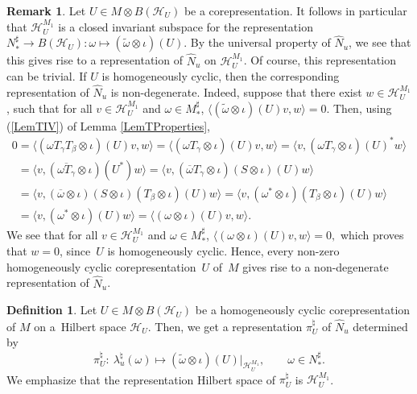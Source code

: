 \documentclass[11pt]{article}
\numberwithin{equation}{section}
\theoremstyle{definition}
\newtheorem{dfn}[thm]{Definition}
\newtheorem{rmk}[thm]{Remark}
\newcommand{\cHil}{\mathcal{H}}
\begin{document}
\begin{rmk}\label{RmkInvSubs}
Let $U \in M \otimes B(\cHil_U)$ be a corepresentation. It follows in particular that $\cHil_U^{M_1}$ is a closed invariant subspace for the  representation $N_\ast^\sharp \rightarrow B(\cHil_U): \omega \mapsto (\tilde{\omega} \otimes \iota)(U)$. By the universal property of $\hat{N}_u$, we see that this gives rise to a representation of $\hat{N}_u$ on $\cHil_U^{M_1}$. Of course, this representation can be trivial. If $U$ is homogeneously cyclic, then the corresponding representation of $\hat{N}_u$ is non-degenerate.  Indeed, suppose that there exist $w \in \cHil_U^{M_1}$, such that for all $v \in \cHil_U^{M_1}$ and $\omega \in M_\ast^\sharp$, $  \langle (\tilde{\omega} \otimes \iota )(U) v, w \rangle =0 $. Then, using (\ref{LemTIV}) of Lemma \ref{LemTProperties},
\begin{gather*}
0 = \langle (\omega  T_\gamma T_\beta \otimes \iota)(U) v, w \rangle =
\langle (\omega T_\gamma  \otimes \iota)(U) v, w \rangle =
\langle  v, (\omega  T_\gamma  \otimes \iota)(U)^\ast w \rangle  \\
\phantom{0}{} =  \langle  v, (\overline{\omega  T_\gamma}  \otimes \iota)(U^\ast) w \rangle =
\langle  v, (\overline{\omega}  T_\gamma  \otimes \iota)(S \otimes \iota)(U) w \rangle  \\
\phantom{0}{} =  \langle  v, (\overline{\omega} \otimes \iota) (S \otimes \iota) (T_\beta \otimes \iota)(U) w \rangle =
 \langle  v, (\omega^\ast  \otimes \iota)(T_\beta \otimes \iota)(U) w\rangle  \\
\phantom{0}{} =  \langle  v, (\omega^\ast  \otimes \iota)(U) w \rangle =
\langle (\omega  \otimes \iota)(U)  v,  w \rangle.
\end{gather*}
We see that for all $v \in \cHil_U^{M_1}$ and $\omega \in M_\ast^\sharp$,
$  \langle (\omega \otimes \iota )(U) v, w \rangle =0,$
which proves that $w = 0$, since~$U$ is homogeneously cyclic. Hence, every non-zero homogeneously cyclic corepresentation~$U$ of~$M$ gives rise to a  non-degenerate representation of $\hat{N}_u$.
\end{rmk}

\begin{dfn}\label{DfnRep}
Let $U \in M \otimes B(\cHil_U)$ be a homogeneously cyclic corepresentation of $M$ on a~Hilbert space $\cHil_U$. Then, we get a representation $\pi_U^\natural$ of $\hat{N}_u$ determined by
\[
\pi_U^\natural: \ \lambda_u^\natural(\omega) \mapsto (\tilde{\omega} \otimes \iota)(U) \vert_{\cHil_{U}^{M_1}}, \qquad \omega \in N_\ast^\sharp.
\]
 We emphasize that the representation Hilbert space of $\pi_U^\natural$ is $\cHil_U^{M_1}$.
\end{dfn}
\end{document}
